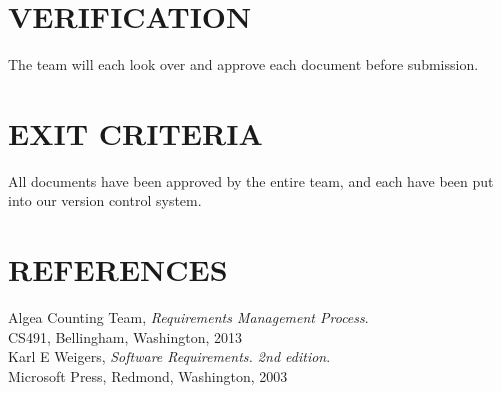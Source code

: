 \documentclass[11pt]{article}
\begin{document}
\section{VERIFICATION}
The team will each look over and approve each document before submission.\\

\section{EXIT CRITERIA}
All documents have been approved by the entire team, and each have been put into our version control system.\\

\section{REFERENCES}

Algea Counting Team,
\emph{Requirements Management Process}. \\
CS491, Bellingham, Washington, 2013\\

  Karl E Weigers,
  \emph{Software Requirements. 2nd edition}. \\
  Microsoft Press, Redmond, Washington, 2003
\end{document}
